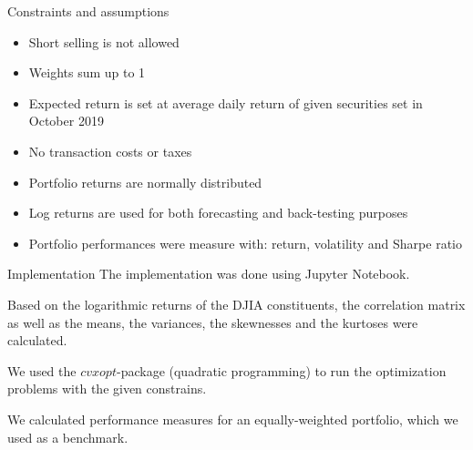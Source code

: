 \documentclass{beamer}
\begin{document}
\begin{frame}{Constraints and assumptions}
\begin{itemize}
    \item Short selling is not allowed 
    \item Weights sum up to 1
    \item Expected return is set at average daily return of given securities set in October 2019 
    \item No transaction costs or taxes
    \item Portfolio returns are normally distributed
    \item Log returns are used for both forecasting and back-testing purposes
    \item Portfolio performances were measure with: return, volatility and Sharpe ratio
\end{itemize}
\end{frame}

\begin{frame}{Implementation}
The implementation was done using Jupyter Notebook.

\vspace{0.5cm}

Based on the logarithmic returns of the DJIA constituents, the correlation matrix as well as the means, the variances, the skewnesses and the kurtoses were calculated.

\vspace{0.5cm}

We used the $cvxopt$-package (quadratic programming) to run the optimization problems with the given constrains.

\vspace{0.5cm}

We calculated performance measures for an equally-weighted portfolio, which we used as a benchmark.

\end{frame}
\end{document}
